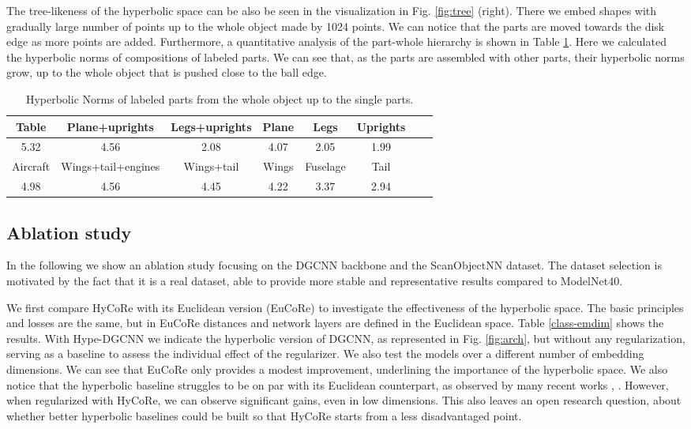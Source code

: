 \documentclass{article}
\begin{document}
The tree-likeness of the hyperbolic space can be also be seen in the visualization in Fig. \ref{fig:tree} (right). There we embed shapes with gradually large number of points up to the whole object made by 1024 points. We can notice that the parts are moved towards the disk edge as more points are added. Furthermore, a quantitative analysis of the part-whole hierarchy is shown in Table \ref{norm-table}. Here we calculated the hyperbolic norms of compositions of labeled parts. We can see that, as the parts are assembled with other parts, their hyperbolic norms grow, up to the whole object that is pushed close to the ball edge.

\begin{table}
  \caption{Hyperbolic Norms of labeled parts from the whole object up to the single parts.}
\label{norm-table}
  \centering
  \begin{tabular}{cccccccc}
    \toprule
Table & Plane+uprights & Legs+uprights & Plane & Legs & Uprights \\
    \midrule
           5.32 & 4.56 & 2.08 & 4.07 & 2.05 & 1.99     \\
    \midrule
          Aircraft & Wings+tail+engines & Wings+tail  & Wings & Fuselage &  Tail \\

          4.98 & 4.56  & 4.45  & 4.22 & 3.37 & 2.94  \\
    \bottomrule
  \end{tabular}
\end{table}




\subsection{Ablation study}

In the following we show an ablation study focusing on the DGCNN backbone and the ScanObjectNN dataset. The dataset selection is motivated by the fact that it is a real dataset, able to provide more stable and representative results compared to ModelNet40.

We first compare HyCoRe with its Euclidean version (EuCoRe) to investigate the effectiveness of the hyperbolic space. The basic principles and losses are the same, but in EuCoRe distances and network layers are defined in the Euclidean space. Table \ref{class-emdim} shows the results. With Hype-DGCNN we indicate the hyperbolic version of DGCNN, as represented in Fig. \ref{fig:arch}, but without any regularization, serving as a baseline to assess the individual effect of the regularizer. We also test the models over a different number of embedding dimensions. We can see that EuCoRe only provides a modest improvement, underlining the importance of the hyperbolic space. We also notice that the hyperbolic baseline struggles to be on par with its Euclidean counterpart, as observed by many recent works \cite{khrulkov2020hyperbolic}, \cite{ganea2018hyperbolic}. However, when regularized with HyCoRe, we can observe significant gains, even in low dimensions.
This also leaves an open research question, about whether better hyperbolic baselines could be built so that HyCoRe starts from a less disadvantaged point. 
\end{document}
